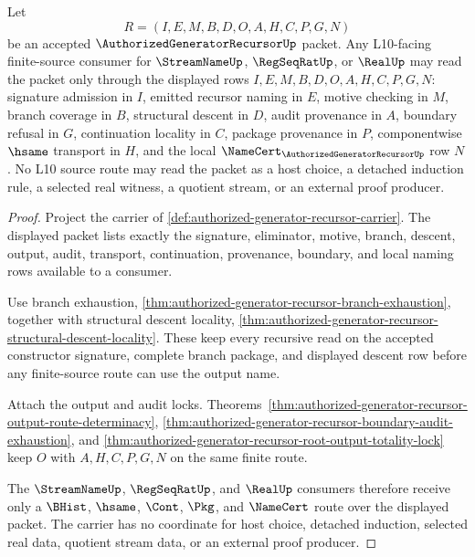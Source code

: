 \begin{theorem}
\label{thm:authorized-generator-recursor-l10-open-phase-source-triad}
Let
$$
R=(I,E,M,B,D,O,A,H,C,P,G,N)
$$
be an accepted $\AuthorizedGeneratorRecursorUp$ packet. Any L10-facing finite-source consumer for $\StreamNameUp$, $\RegSeqRatUp$, or $\RealUp$ may read the packet only through the displayed rows $I,E,M,B,D,O,A,H,C,P,G,N$: signature admission in $I$, emitted recursor naming in $E$, motive checking in $M$, branch coverage in $B$, structural descent in $D$, audit provenance in $A$, boundary refusal in $G$, continuation locality in $C$, package provenance in $P$, componentwise $\hsame$ transport in $H$, and the local $\NameCert_{\AuthorizedGeneratorRecursorUp}$ row $N$. No L10 source route may read the packet as a host choice, a detached induction rule, a selected real witness, a quotient stream, or an external proof producer.
\end{theorem}
\begin{proof}
Project the carrier of \autoref{def:authorized-generator-recursor-carrier}. The displayed packet lists exactly the signature, eliminator, motive, branch, descent, output, audit, transport, continuation, provenance, boundary, and local naming rows available to a consumer.

Use branch exhaustion, \autoref{thm:authorized-generator-recursor-branch-exhaustion}, together with structural descent locality, \autoref{thm:authorized-generator-recursor-structural-descent-locality}. These keep every recursive read on the accepted constructor signature, complete branch package, and displayed descent row before any finite-source route can use the output name.

Attach the output and audit locks. Theorems~\ref{thm:authorized-generator-recursor-output-route-determinacy}, \ref{thm:authorized-generator-recursor-boundary-audit-exhaustion}, and \ref{thm:authorized-generator-recursor-root-output-totality-lock} keep $O$ with $A,H,C,P,G,N$ on the same finite route.

The $\StreamNameUp$, $\RegSeqRatUp$, and $\RealUp$ consumers therefore receive only a $\BHist$, $\hsame$, $\Cont$, $\Pkg$, and $\NameCert$ route over the displayed packet. The carrier has no coordinate for host choice, detached induction, selected real data, quotient stream data, or an external proof producer.
\end{proof}

